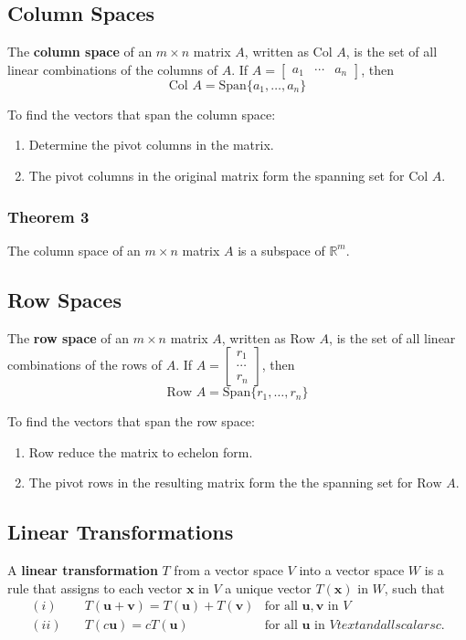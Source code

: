 \documentclass{article}
\begin{document}
\vspace{1em}

\subsection*{Column Spaces}
The \textbf{column space} of an $m\times n$ matrix $A$, written as $\text{Col } A$, is the set of
all linear combinations of the columns of $A$. If
$A=\begin{bmatrix}a_1 & \cdots & a_n\end{bmatrix}$, then
\[\text{Col } A = \text{Span}\{a_1, \ldots, a_n\}\]

To find the vectors that span the column space:
\begin{enumerate}
    \item Determine the pivot columns in the matrix.
    \item The pivot columns in the original matrix form the spanning set for $\text{Col } A$.
\end{enumerate}

\subsubsection*{Theorem 3}
The column space of an $m\times n$ matrix $A$ is a subspace of $\mathbb{R}^m$.

\subsection*{Row Spaces}
The \textbf{row space} of an $m\times n$ matrix $A$, written as $\text{Row } A$, is the set of all
linear combinations of the rows of $A$. If $A=\begin{bmatrix}r_1 \\ \cdots \\ r_n\end{bmatrix}$,
then
\[\text{Row } A = \text{Span}\{r_1, \ldots, r_n\}\]

To find the vectors that span the row space:
\begin{enumerate}
    \item Row reduce the matrix to echelon form.
    \item The pivot rows in the resulting matrix form the the spanning set for $\text{Row } A$.
\end{enumerate}

\subsection*{Linear Transformations}
A \textbf{linear transformation} $T$ from a vector space $V$ into a vector space $W$ is a rule that
assigns to each vector $\mathbf{x}$ in $V$ a unique vector $T(\mathbf{x})$ in $W$, such that
\begin{align*}
    (i) &\quad T(\mathbf{u} + \mathbf{v}) = T(\mathbf{u}) + T(\mathbf{v}) & \text{for all }
    \mathbf{u}, \mathbf{v} \text{ in } V \\
    (ii) &\quad T(c \mathbf{u}) = c T(\mathbf{u}) & \text{for all } \mathbf{u} \text{ in } V 
    text{ and all scalars } c.
\end{align*}
\end{document}
